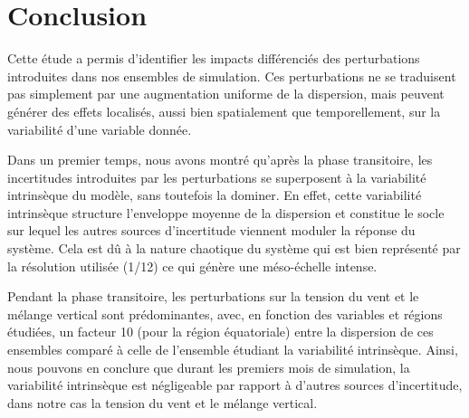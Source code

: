 \section{Conclusion}

Cette étude a permis d’identifier les impacts différenciés des perturbations introduites dans nos ensembles de simulation. Ces perturbations ne se traduisent pas simplement par une augmentation uniforme de la dispersion, mais peuvent générer des effets localisés, aussi bien spatialement que temporellement, sur la variabilité d’une variable donnée.

Dans un premier temps, nous avons montré qu'après la phase transitoire, les incertitudes introduites par les perturbations se superposent à la variabilité intrinsèque du modèle, sans toutefois la dominer. En effet, cette variabilité intrinsèque structure l’enveloppe moyenne de la dispersion et constitue le socle sur lequel les autres sources d’incertitude viennent moduler la réponse du système. Cela est dû à la nature chaotique du système qui est bien représenté par la résolution utilisée (1/12\degree) ce qui génère une méso-échelle intense.

Pendant la phase transitoire, les perturbations sur la tension du vent et le mélange vertical sont prédominantes, avec, en fonction des variables et régions étudiées, un facteur 10 (pour la région équatoriale) entre la dispersion de ces ensembles comparé à celle de l'ensemble étudiant la variabilité intrinsèque. Ainsi, nous pouvons en conclure que durant les premiers mois de simulation, la variabilité intrinsèque est négligeable par rapport à d'autres sources d'incertitude, dans notre cas la tension du vent et le mélange vertical.


